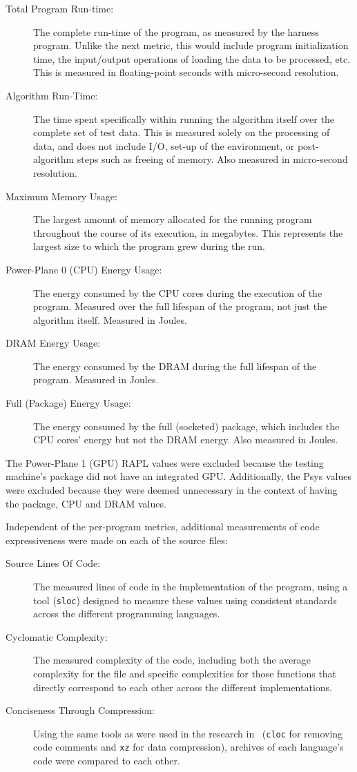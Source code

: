 \begin{description}
\item[Total Program Run-time:] The complete run-time of the program, as measured by the harness program. Unlike the next metric, this would include program initialization time, the input/output operations of loading the data to be processed, etc. This is measured in floating-point seconds with micro-second resolution.
\item[Algorithm Run-Time:] The time spent specifically within running the algorithm itself over the complete set of test data. This is measured solely on the processing of data, and does not include I/O, set-up of the environment, or post-algorithm steps such as freeing of memory. Also measured in micro-second resolution.
\item[Maximum Memory Usage:] The largest amount of memory allocated for the running program throughout the course of its execution, in megabytes. This represents the largest size to which the program grew during the run.
\item[Power-Plane 0 (CPU) Energy Usage:] The energy consumed by the CPU cores during the execution of the program. Measured over the full lifespan of the program, not just the algorithm itself. Measured in Joules.
\item[DRAM Energy Usage:] The energy consumed by the DRAM during the full lifespan of the program. Measured in Joules.
\item[Full (Package) Energy Usage:] The energy consumed by the full (socketed) package, which includes the CPU cores' energy but not the DRAM energy. Also measured in Joules.
\end{description}

The Power-Plane 1 (GPU) RAPL values were excluded because the testing machine's package did not have an integrated GPU. Additionally, the Psys values were excluded because they were deemed unnecessary in the context of having the package, CPU and DRAM values.

Independent of the per-program metrics, additional measurements of code expressiveness were made on each of the source files:

\begin{description}
\item[Source Lines Of Code:] The measured lines of code in the implementation of the program, using a tool (\texttt{sloc}) designed to measure these values using consistent standards across the different programming languages.
\item[Cyclomatic Complexity:] The measured complexity of the code, including both the average complexity for the file and specific complexities for those functions that directly correspond to each other across the different implementations.
\item[Conciseness Through Compression:] Using the same tools as were used in the research in~\cite{bergmans} (\texttt{cloc} for removing code comments and \texttt{xz} for data compression), archives of each language's code were compared to each other.
\end{description}

